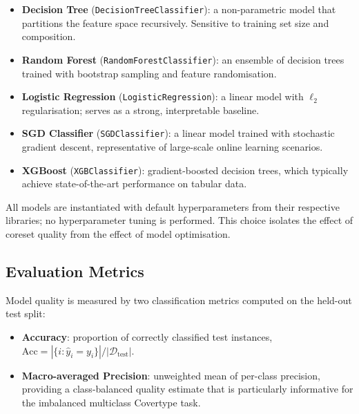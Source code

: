 \documentclass{article}
\begin{document}
\begin{itemize}
  \item \textbf{Decision Tree} (\texttt{DecisionTreeClassifier}):
        a non-parametric model that partitions the feature space recursively.
        Sensitive to training set size and composition.

  \item \textbf{Random Forest} (\texttt{RandomForestClassifier}):
        an ensemble of decision trees trained with bootstrap sampling and
        feature randomisation.

  \item \textbf{Logistic Regression} (\texttt{LogisticRegression}):
        a linear model with $\ell_2$ regularisation; serves as a
        strong, interpretable baseline.

  \item \textbf{SGD Classifier} (\texttt{SGDClassifier}):
        a linear model trained with stochastic gradient descent,
        representative of large-scale online learning scenarios.

  \item \textbf{XGBoost} (\texttt{XGBClassifier}):
        gradient-boosted decision trees, which typically achieve
        state-of-the-art performance on tabular data.
\end{itemize}

All models are instantiated with default hyperparameters from their
respective libraries; no hyperparameter tuning is performed.
This choice isolates the effect of coreset quality from the effect of
model optimisation.

\subsection{Evaluation Metrics}

Model quality is measured by two classification metrics computed on the
held-out test split:

\begin{itemize}
  \item \textbf{Accuracy}: proportion of correctly classified test instances,
        $\text{Acc} = |\{i : \hat{y}_i = y_i\}| / |\mathcal{D}_\text{test}|$.
  \item \textbf{Macro-averaged Precision}: unweighted mean of per-class
        precision, providing a class-balanced quality estimate that is
        particularly informative for the imbalanced multiclass Covertype task.
\end{itemize}
\end{document}
